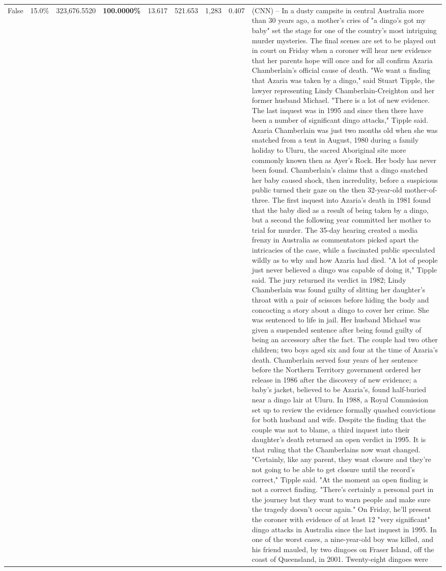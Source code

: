 \begin{table}[H]
\begin{tabular}{lllrlllll}
False & 15.0\% & 323,676.5520 & \bfseries \color{red} 100.0000\% & 13.617 & 521.653 & 1,283 & 0.407 & (CNN) -- In a dusty campsite in central Australia more than 30 years ago, a mother's cries of "a dingo's got my baby" set the stage for one of the country's most intriguing murder mysteries. The final scenes are set to be played out in court on Friday when a coroner will hear new evidence that her parents hope will once and for all confirm Azaria Chamberlain's official cause of death. "We want a finding that Azaria was taken by a dingo," said Stuart Tipple, the lawyer representing Lindy Chamberlain-Creighton and her former husband Michael. "There is a lot of new evidence. The last inquest was in 1995 and since then there have been a number of significant dingo attacks," Tipple said. Azaria Chamberlain was just two months old when she was snatched from a tent in August, 1980 during a family holiday to Uluru, the sacred Aboriginal site more commonly known then as Ayer's Rock. Her body has never been found. Chamberlain's claims that a dingo snatched her baby caused shock, then incredulity, before a suspicious public turned their gaze on the then 32-year-old mother-of-three. The first inquest into Azaria's death in 1981 found that the baby died as a result of being taken by a dingo, but a second the following year committed her mother to trial for murder. The 35-day hearing created a media frenzy in Australia as commentators picked apart the intricacies of the case, while a fascinated public speculated wildly as to why and how Azaria had died. "A lot of people just never believed a dingo was capable of doing it," Tipple said. The jury returned its verdict in 1982; Lindy Chamberlain was found guilty of slitting her daughter's throat with a pair of scissors before hiding the body and concocting a story about a dingo to cover her crime. She was sentenced to life in jail. Her husband Michael was given a suspended sentence after being found guilty of being an accessory after the fact. The couple had two other children; two boys aged six and four at the time of Azaria's death. Chamberlain served four years of her sentence before the Northern Territory government ordered her release in 1986 after the discovery of new evidence; a baby's jacket, believed to be Azaria's, found half-buried near a dingo lair at Uluru. In 1988, a Royal Commission set up to review the evidence formally quashed convictions for both husband and wife. Despite the finding that the couple was not to blame, a third inquest into their daughter's death returned an open verdict in 1995. It is that ruling that the Chamberlains now want changed. "Certainly, like any parent, they want closure and they're not going to be able to get closure until the record's correct," Tipple said. "At the moment an open finding is not a correct finding. "There's certainly a personal part in the journey but they want to warn people and make sure the tragedy doesn't occur again." On Friday, he'll present the coroner with evidence of at least 12 "very significant" dingo attacks in Australia since the last inquest in 1995. In one of the worst cases, a nine-year-old boy was killed, and his friend mauled, by two dingoes on Fraser Island, off the coast of Queensland, in 2001. Twenty-eight dingoes were 
\end{tabular}
\end{table}
